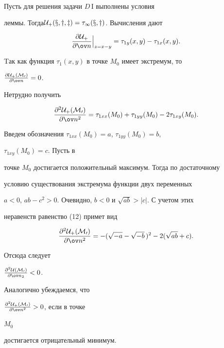 \begin{pf} Пусть для решения задачи $D$\,I выполнены условия  


леммы. Тогда\linebreak $\cal U_+(x,y,z)=\tau_1(x,y)$. Вычисления дают 


$$ 


\frac{\partial\cal U_+}{\partial\ov n}\Big|_{z=x-y}= 


\tau_{1y}(x,y)-\tau_{1x}(x,y). 


$$ 


Tак как функция $\tau_1(x,y)$ в точке $M_0$ имеет экстремум, то 


$\frac{\partial\cal U_+(M_0)}{\partial\ov n}=0$. 


Нетрудно получить 


\begin{equation} 


\frac{\partial^2\cal U_+(M_0)}{\partial\ov n^2}= 


\tau_{1xx}(M_0)+\tau_{1yy}(M_0)-2\tau_{1xy}(M_0). 


\end{equation} 


 


Введем обозначения $\tau_{1xx}(M_0)=a$, $\tau_{1yy}(M_0)=b$, 


$\tau_{1xy}(M_0)=c$. Пусть в  


точке $M_0$ достигается положительный максимум. Тогда по достаточному 


условию существования экстремума функции двух переменных  


$a<0$, $ab-c^2>0$. Очевидно, $b<0$ и $\sqrt{ab}>|c|$. С учетом этих 


неравенств равенство (12) примет вид 


$$ 


\frac{\partial^2\cal U_+(M_0)}{\partial\ov n^2}=- 


(\sqrt{-a}-\sqrt{-b}\,)^2-2(\sqrt{ab}+c). 


$$ 


Отсюда следует 


$\frac{\partial^2\cal U(M_0)}{\partial\ov n_2}<0$. 


Аналогично убеждаемся, что 


$\frac{\partial^2\cal U_+(M_0)}{\partial\ov n^2}>0$, если в точке 


$M_0$ 


достигается отрицательный минимум.  


\end{pf} 


